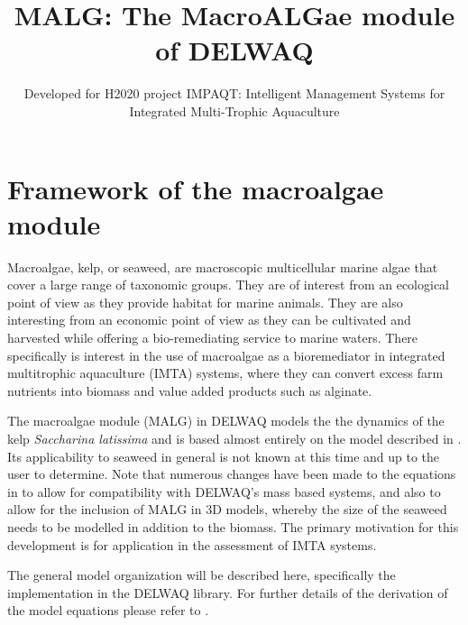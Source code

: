 \documentclass{deltares_manual}
\begin{document}
\title{MALG: The MacroALGae module of DELWAQ}
\subtitle{Developed for H2020 project IMPAQT: Intelligent Management Systems for Integrated Multi-Trophic Aquaculture}
\deltarestitle
	
\chapter{Framework of the macroalgae module}

Macroalgae, kelp, or seaweed, are macroscopic multicellular marine algae that cover a large range of taxonomic groups. They are of interest from an ecological point of view as they provide habitat for marine animals. They are also interesting from an economic point of view as they can be cultivated and harvested while offering a bio-remediating service to marine waters. There specifically is interest in the use of macroalgae as a bioremediator in integrated multitrophic aquaculture (IMTA) systems, where they can convert excess farm nutrients into biomass and value added products such as alginate. 

The macroalgae module (MALG) in DELWAQ models the the dynamics of the kelp \textit{Saccharina latissima} and is based almost entirely on the model described in \cite{broch2012}. Its applicability to seaweed in general is not known at this time and up to the user to determine. Note that numerous changes have been made to the equations in \cite{broch2012} to allow for compatibility with DELWAQ's mass based systems, and also to allow for the inclusion of MALG in 3D models, whereby the size of the seaweed needs to be modelled in addition to the biomass. The primary motivation for this development is for application in the assessment of IMTA systems. 

The general model organization will be described here, specifically the implementation in the DELWAQ library. For further details of the derivation of the model equations please refer to \cite{broch2012}.
\end{document}
